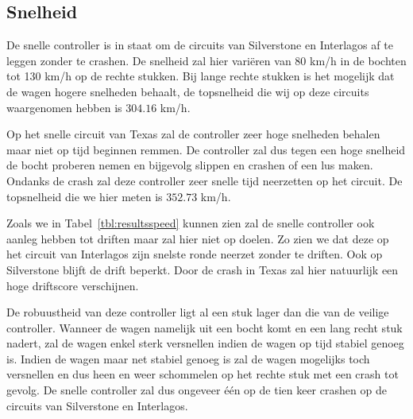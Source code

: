 \subsection{Snelheid}
De snelle controller is in staat om de circuits van Silverstone en Interlagos af
te leggen zonder te crashen. De snelheid zal hier vari\"eren van 80
km/h in de bochten tot 130 km/h op de rechte stukken. Bij lange rechte stukken
is het mogelijk dat de wagen hogere snelheden behaalt, de topsnelheid die wij op
deze circuits waargenomen hebben is $304.16$ km/h.

Op het snelle circuit van Texas zal de controller zeer hoge snelheden behalen
maar niet op tijd beginnen remmen. De controller zal dus tegen een hoge snelheid
de bocht proberen nemen en bijgevolg slippen en crashen of een lus maken. Ondanks de crash zal
deze controller zeer snelle tijd neerzetten op het circuit. De topsnelheid die we hier meten is $352.73$ km/h.

Zoals we in Tabel~\ref{tbl:resultsspeed} kunnen zien zal de snelle controller ook aanleg hebben tot driften maar zal hier niet op doelen. Zo zien we dat deze op het circuit van Interlagos zijn snelste ronde neerzet zonder te driften. Ook op Silverstone blijft de drift beperkt. Door de crash in Texas zal hier natuurlijk een hoge driftscore verschijnen.

De robuustheid van deze controller ligt al een stuk lager dan die van de veilige controller. Wanneer de wagen namelijk uit een bocht komt en een lang recht stuk nadert, zal de wagen enkel sterk versnellen indien de wagen op tijd stabiel genoeg is. Indien de wagen maar net stabiel genoeg is zal de wagen mogelijks toch versnellen en dus heen en weer schommelen op het rechte stuk met een crash tot gevolg. De snelle controller zal dus ongeveer één op de tien keer crashen op de circuits van Silverstone en Interlagos.